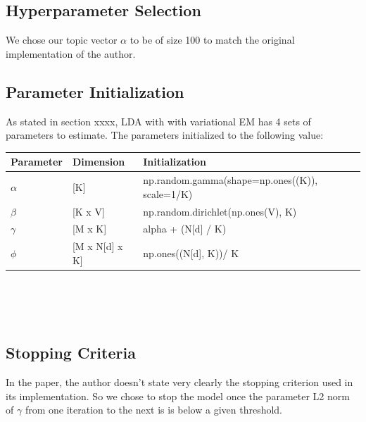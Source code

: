 \documentclass[11pt]{article}
\begin{document}
\subsection{Hyperparameter Selection}
We chose our topic vector $\alpha$ to be of size 100 to match the original implementation of the author. 

\subsection{Parameter   Initialization}
As stated in section xxxx, LDA with with variational EM has 4 sets of parameters to estimate. The parameters initialized to the following value:

\begin{tabular}{ |p{2cm}||p{3cm}|p{10cm}| }
 \hline
 Parameter & Dimension  & Initialization\\
 \hline
  $\alpha$& [K]   & np.random.gamma(shape=np.ones((K)), scale=1/K)\\
  $\beta$  & [K x V]  &  np.random.dirichlet(np.ones(V), K)\\
  $\gamma $  & [M x K]  &  alpha + (N[d] / K)  \\
  $\phi$  & [M x N[d] x K]  &   np.ones((N[d], K))/ K \\
  \hline
\end{tabular}\\
\\
\\
\subsection{Stopping Criteria }
In the paper, the author doesn't state very clearly the stopping criterion used in its implementation. So we chose to stop the model once the parameter L2 norm of $\gamma$   from one iteration to the next is is below a given threshold. 
\\
\end{document}
